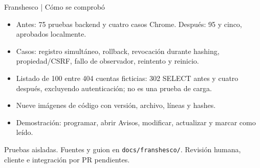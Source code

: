 \begin{frame}{Franshesco | Cómo se comprobó}
\begin{itemize}
\item Antes: 75 pruebas backend y cuatro casos Chrome. Después: 95 y cinco, aprobados localmente.
\item Casos: registro simultáneo, rollback, revocación durante hashing, propiedad/CSRF, fallo de observador, reintento y reinicio.
\item Listado de 100 entre 404 cuentas ficticias: 302 SELECT antes y cuatro después, excluyendo autenticación; no es una prueba de carga.
\item Nueve imágenes de código con versión, archivo, líneas y hashes.
\item Demostración: programar, abrir Avisos, modificar, actualizar y marcar como leído.
\end{itemize}
\small Pruebas aisladas. Fuentes y guion en \texttt{docs/franshesco/}. Revisión humana, cliente e integración por PR pendientes.
\end{frame}
